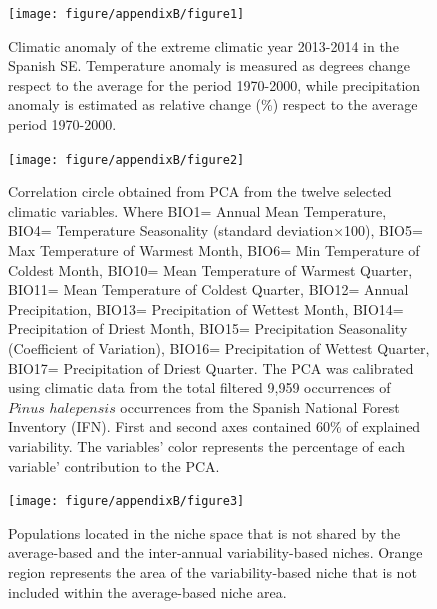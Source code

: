 \documentclass[11pt,twoside]{reedthesis}
\begin{document}
\setlength{\abovecaptionskip}{10pt}
\begin{figure}[hbt!]

{\centering \texttt{[image: figure/appendixB/figure1]} 

}

\caption[ Climatic anomaly of the extreme climatic year 2013-2014 in the Spanish SE]{Climatic anomaly of the extreme climatic year 2013-2014 in the Spanish SE. Temperature anomaly is measured as degrees change respect to the average for the period 1970-2000, while precipitation anomaly is estimated as relative change (\%) respect to the average period 1970-2000.}\label{fig:apc1}
\end{figure}\newpage
\begin{figure}[hbt!]

{\centering \texttt{[image: figure/appendixB/figure2]} 

}

\caption[Correlation circle obtained from PCA calibrated with $Pinus$ $halepnsis$ occurrences]{Correlation circle obtained from PCA from the twelve selected climatic variables. Where BIO1= Annual Mean Temperature, BIO4= Temperature Seasonality (standard deviation×100), BIO5= Max Temperature of Warmest Month, BIO6= Min Temperature of Coldest Month, BIO10= Mean Temperature of Warmest Quarter, BIO11= Mean Temperature of Coldest Quarter, BIO12= Annual Precipitation, BIO13= Precipitation of Wettest Month, BIO14= Precipitation of Driest Month, BIO15= Precipitation Seasonality (Coefficient of Variation), BIO16= Precipitation of Wettest Quarter, BIO17= Precipitation of Driest Quarter. The PCA was calibrated using climatic data from the total filtered 9,959 occurrences of $Pinus$ $halepensis$ occurrences from the Spanish National Forest Inventory (IFN).  First and second axes contained 60\% of explained variability. The variables' color represents the percentage of each variable' contribution to the PCA.}\label{fig:apc2}
\end{figure}\newpage
\begin{figure}[hbt!]

{\centering \texttt{[image: figure/appendixB/figure3]} 

}

\caption[Populations located in the $Pinus$ niche space not shared by the average-based and the inter-annual variability-based niches]{Populations located in the niche space that is not shared by the average-based and the inter-annual variability-based niches. Orange region represents the area of the variability-based niche that is not included within the average-based niche area.}\label{fig:apc3}
\end{figure}\newpage
\end{document}
